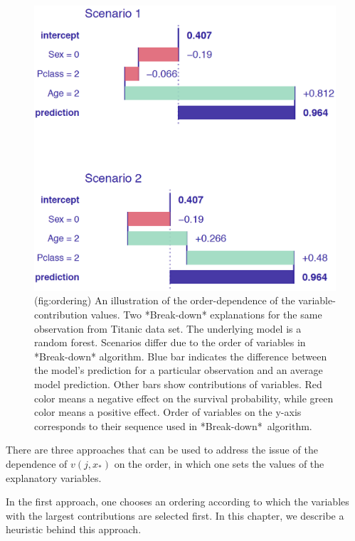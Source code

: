 \documentclass[12pt,]{krantz}
\begin{document}
\begin{figure}

{\centering \includegraphics[width=1\linewidth]{figure/ordering} 

}

\caption{(fig:ordering) An illustration of the order-dependence of the variable-contribution values. Two *Break-down* explanations for the same observation from Titanic data set. The underlying model is a random forest. Scenarios differ due to the order of variables in *Break-down* algorithm. Blue bar indicates the difference between the model's prediction for a particular observation and an average model prediction. Other bars show contributions of variables. Red color means a negative effect on the survival probability, while green color means a positive effect. Order of variables on the y-axis corresponds to their sequence used in *Break-down*~algorithm.}\label{fig:ordering}
\end{figure}

There are three approaches that can be used to address the issue of the dependence of \(v(j, x_*)\) on the order, in which one sets the values of the explanatory variables.

In the first approach, one chooses an ordering according to which the variables with the largest contributions are selected first. In this chapter, we describe a heuristic behind this approach.
\end{document}
